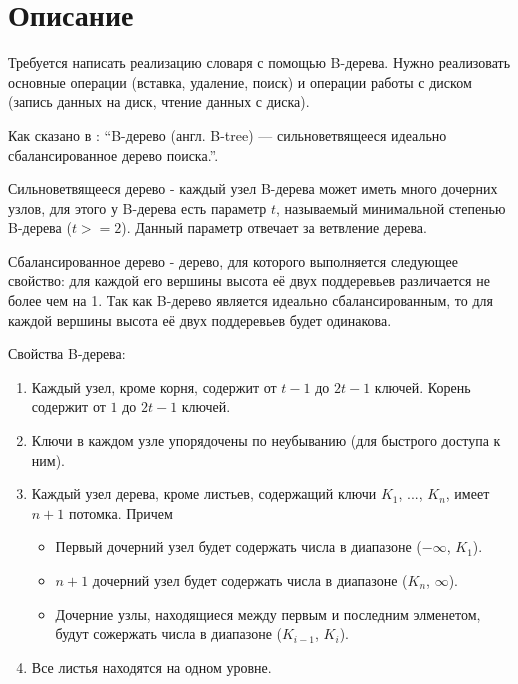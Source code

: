 \section{Описание}
Требуется написать реализацию словаря с помощью B-дерева. Нужно реализовать основные операции (вставка, удаление, поиск) и 
операции работы с диском (запись данных на диск, чтение данных с диска).


Как сказано в \cite{wiki_abstract}: \enquote{B-дерево (англ. B-tree) — сильноветвящееся идеально сбалансированное дерево поиска.}.


Сильноветвящееся дерево - каждый узел B-дерева может иметь много дочерних узлов, для этого у B-дерева есть параметр $t$, 
называемый минимальной степенью B-дерева ($t >= 2$). Данный параметр отвечает за ветвление дерева.


Сбалансированное дерево - дерево, для которого выполняется следующее свойство: для каждой его вершины высота её двух поддеревьев различается не более чем на 1.
Так как B-дерево является идеально сбалансированным, то для каждой вершины высота её двух поддеревьев будет одинакова.

\vspace{2\baselineskip}
Свойства B-дерева:

\begin{enumerate}
    \item Каждый узел, кроме корня, содержит от $t-1$ до $2t-1$ ключей. Корень содержит от $1$ до $2t-1$ ключей. 
    \item Ключи в каждом узле упорядочены по неубыванию (для быстрого доступа к ним).
    \item Каждый узел дерева, кроме листьев, содержащий ключи $K_1$, ..., $K_n$, имеет $n+1$ потомка. Причем
    
    \begin{itemize}
        \item Первый дочерний узел будет содержать числа в диапазоне ($-\infty$, $K_1$).
        \item $n+1$ дочерний узел будет содержать числа в диапазоне ($K_n$, $\infty$).
        \item Дочерние узлы, находящиеся между первым и последним элменетом, будут сожержать числа в диапазоне ($K_{i-1}$, $K_i$).
    \end{itemize}

    \item Все листья находятся на одном уровне.
\end{enumerate}


